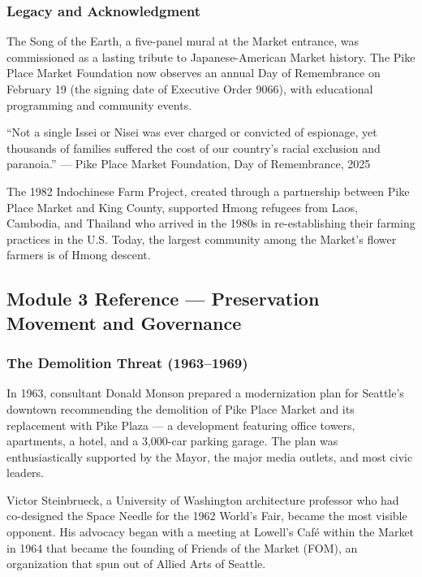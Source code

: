 \documentclass[11pt,letterpaper]{article}
\begin{document}
\subsubsection{Legacy and Acknowledgment}

The Song of the Earth, a five-panel mural at the Market entrance, was commissioned as a lasting tribute to Japanese-American Market history. The Pike Place Market Foundation now observes an annual Day of Remembrance on February 19 (the signing date of Executive Order 9066), with educational programming and community events.

\begin{quotebox}
``Not a single Issei or Nisei was ever charged or convicted of espionage, yet thousands of families suffered the cost of our country's racial exclusion and paranoia.'' --- Pike Place Market Foundation, Day of Remembrance, 2025
\end{quotebox}

The 1982 Indochinese Farm Project, created through a partnership between Pike Place Market and King County, supported Hmong refugees from Laos, Cambodia, and Thailand who arrived in the 1980s in re-establishing their farming practices in the U.S. Today, the largest community among the Market's flower farmers is of Hmong descent.

\subsection{Module 3 Reference --- Preservation Movement and Governance}

\subsubsection{The Demolition Threat (1963--1969)}

In 1963, consultant Donald Monson prepared a modernization plan for Seattle's downtown recommending the demolition of Pike Place Market and its replacement with Pike Plaza --- a development featuring office towers, apartments, a hotel, and a 3,000-car parking garage. The plan was enthusiastically supported by the Mayor, the major media outlets, and most civic leaders.

Victor Steinbrueck, a University of Washington architecture professor who had co-designed the Space Needle for the 1962 World's Fair, became the most visible opponent. His advocacy began with a meeting at Lowell's Café within the Market in 1964 that became the founding of Friends of the Market (FOM), an organization that spun out of Allied Arts of Seattle.
\end{document}
